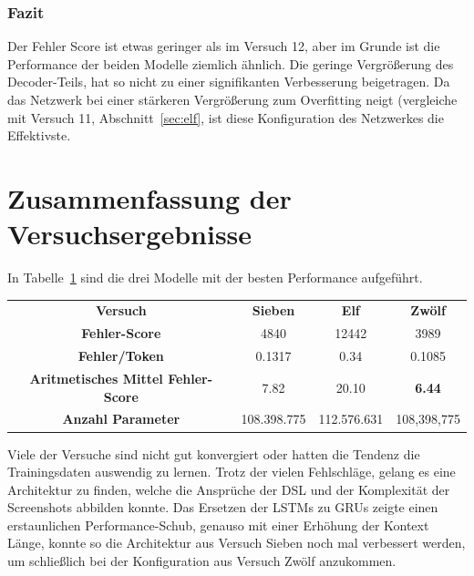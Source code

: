\documentclass[pdftex,a4paper,halfparskip, article]{scrartcl}
\begin{document}
\subsubsection*{Fazit}

Der Fehler Score ist etwas geringer als im Versuch 12, aber im Grunde ist die Performance der beiden Modelle ziemlich ähnlich. Die geringe Vergrößerung des Decoder-Teils, hat so nicht zu einer signifikanten Verbesserung beigetragen. Da das Netzwerk bei einer stärkeren Vergrößerung zum Overfitting neigt (vergleiche mit Versuch 11, Abschnitt~\ref{sec:elf}, ist diese Konfiguration des Netzwerkes die Effektivste.

\section{Zusammenfassung der Versuchsergebnisse}

In Tabelle~\ref{tab:comparison} sind die drei Modelle mit der besten Performance aufgeführt.

\begin{table}[]
\begin{tabular}{cccc}
\textbf{Versuch}                           & \textbf{Sieben} & \textbf{Elf} & \textbf{Zwölf} \\
\textbf{Fehler-Score}                      & 4840            & 12442        & 3989           \\
\textbf{Fehler/Token}                      & 0.1317          & 0.34         & 0.1085         \\
\textbf{Aritmetisches Mittel Fehler-Score} & 7.82            & 20.10        & \textbf{6.44}           \\
\textbf{Anzahl Parameter}                  & 108.398.775     & 112.576.631  & 108,398,775   
\end{tabular}
\label{tab:comparison}
\end{table}

Viele der Versuche sind nicht gut konvergiert oder hatten die Tendenz die Trainingsdaten auswendig zu lernen. Trotz der vielen Fehlschläge, gelang es eine Architektur zu finden, welche die Ansprüche der DSL und der Komplexität der Screenshots abbilden konnte. 
Das Ersetzen der LSTMs zu GRUs zeigte einen erstaunlichen Performance-Schub, genauso mit einer Erhöhung der Kontext Länge, konnte so die Architektur aus Versuch Sieben noch mal verbessert werden, um schließlich bei der Konfiguration aus Versuch Zwölf anzukommen. 
\end{document}
